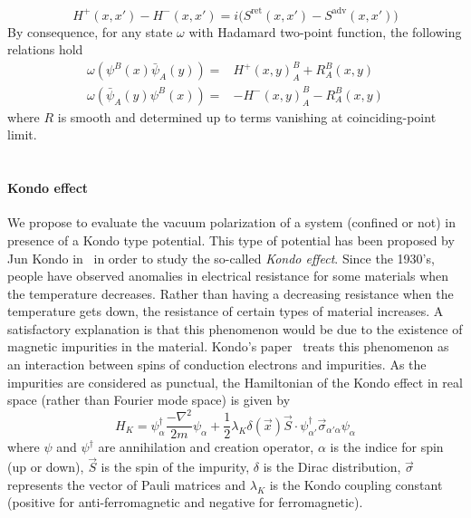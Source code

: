 \begin{equation*}
H^+(x,x') - H^-(x,x') = i\big(S^{\mathrm{ret}}(x,x') - S^{\mathrm{adv}}(x,x')\big)
\end{equation*}
By consequence, for any state $\omega$ with Hadamard two-point function, the following relations hold
\begin{equation*}
\begin{split}
\omega(\psi^B(x)\bar{\psi}_A(y)) = & H^+(x,y)^B_A + R^B_A(x,y) \\
\omega(\bar{\psi}_A(y)\psi^B(x)) = &- H^-(x,y)^B_A - R^B_A(x,y)
\end{split}
\end{equation*}
where $R$ is smooth and determined up to terms vanishing at coinciding-point limit. \\\\
%
%
%
%
\paragraph{Kondo effect}
We propose to evaluate the vacuum polarization of a system (confined or not) 
in presence of a Kondo type potential.
This type of potential has been proposed by Jun Kondo in~\cite{Kondo1964} in order to study the so-called \textit{Kondo effect}.
Since the 1930's, people have observed anomalies in electrical resistance for some materials when the temperature decreases. 
Rather than having a decreasing resistance when the temperature gets down,
the resistance of certain types of material increases. 
A satisfactory explanation is that this phenomenon would be due to the existence of magnetic impurities in the material. 
Kondo's paper~\cite{Kondo1964} treats this phenomenon as an interaction between spins of conduction electrons and impurities.
As the impurities are considered as punctual,
the Hamiltonian of the Kondo effect in real space (rather than Fourier mode space) is given by~\cite{Erdmenger2013}
\begin{equation}\label{vacuum-kondohamiltonian}
H_K = \psi_\alpha^\dagger \frac{-\nabla^2}{2m}\psi_\alpha +
\frac 1 2\lambda_K \delta(\vec{x})\vec{S}\cdot \psi_{\alpha'}^\dagger  \vec{\sigma}_{\alpha' \alpha} \psi_\alpha
\end{equation}
where $\psi$ and $\psi^\dagger$ are annihilation and creation operator, 
$\alpha$ is the indice for spin (up or down), 
$\vec{S}$ is the spin of the impurity,
$\delta$ is the Dirac distribution,
$\vec{\sigma}$ represents the vector of Pauli matrices and $\lambda_K$ is the Kondo coupling constant (positive for anti-ferromagnetic and negative for ferromagnetic).
















